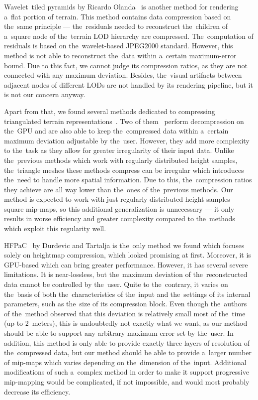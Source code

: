  Wavelet~tiled pyramids by Ricardo Olanda~\cite{jpeg2000terrain} is another method for rendering a~flat portion of terrain. This method contains data compression based on the~same principle --- the~residuals needed to reconstruct the~children of a~square node of the~terrain LOD hierarchy are compressed. The~computation of residuals is based on the~wavelet-based JPEG2000 standard. However, this method is not able to reconstruct the~data within a~certain maximum-error bound. Due to this fact, we cannot judge its compression ratios, as they are not connected with any maximum deviation. Besides, the~visual artifacts between adjacent nodes of different LODs are not handled by its rendering pipeline, but it is not our concern anyway.
 
 Apart from that, we found several methods dedicated to compressing triangulated terrain representations~\cite{meshesGPU1, meshesGPU2, meshes}. Two of them~\cite{meshesGPU1, meshesGPU2} perform decompression on the~GPU and are also able to keep the~compressed data within a~certain maximum deviation adjustable by the~user. However, they add more complexity to the~task as they allow for greater irregularity of their input data. Unlike the~previous methods which work with regularly distributed height samples, the~triangle meshes these methods compress can be irregular which introduces the~need to handle more spatial information. Due to this, the~compression ratios they achieve are all way lower than the~ones of the~previous methods. Our method is expected to work with just regularly distributed height samples --- square mip-maps, so this additional generalization is unnecessary --- it only results in worse efficiency and greater complexity compared to the~methods which exploit this regularity well.
 
 HFPaC~\cite{fieldGPU} by Durdevic and Tartalja is the~only method we found which focuses solely on heightmap compression, which looked promising at first. Moreover, it is GPU-based which can bring greater performance. However, it has several severe limitations. It is near-lossless, but the~maximum deviation of the~reconstructed data cannot be controlled by the~user. Quite to the~contrary, it varies on the~basis of both the~characteristics of the~input and the~settings of its internal parameters, such as the~size of its compression block. Even though the~authors of the~method observed that this deviation is relatively small most of the~time (up to 2~meters), this is undoubtedly not exactly what we want, as our method should be able to support any arbitrary maximum error set by the~user. In addition, this method is only able to provide exactly three layers of resolution of the~compressed data, but our method should be able to provide a~larger number of mip-maps which varies depending on the~dimension of the~input. Additional modifications of such a~complex method in order to make it support progressive mip-mapping would be complicated, if not impossible, and would most probably decrease its efficiency.
 
